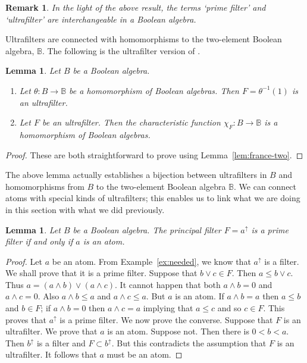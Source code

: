 \documentclass[a4paper]{amsart}
\newtheorem{lemma}[theorem]{Lemma}
\newtheorem{remark}[theorem]{Remark}
\begin{document}
\begin{remark}\label{rem:ba-prime-equal-uf}
{\em 
In the light of the above result, the terms `prime filter' and `ultrafilter' are interchangeable in a Boolean algebra.}
\end{remark}

Ultrafilters are connected with homomorphisms to the two-element Boolean algebra, $\mathbb{B}$.
The following is the ultrafilter version of \cite[Proposition 2.2]{Johnstone}.

\begin{lemma}\label{lem:hm} Let $B$ be a Boolean algebra.
\begin{enumerate} 
\item Let $\theta \colon B \rightarrow \mathbb{B}$ be a homomorphism of Boolean algebras.
Then $F = \theta^{-1}(1)$ is an ultrafilter.
\item Let $F$ be an ultrafilter. Then the characteristic function $\chi_{F} \colon B \rightarrow \mathbb{B}$
is a homomorphism of Boolean algebras.
\end{enumerate}
\end{lemma}
\begin{proof} 
These are both straightforward to prove using Lemma~\ref{lem:france-two}.
\end{proof}

The above lemma actually establishes a bijection between ultrafilters in $B$ and homomorphisms
from $B$ to the two-element Boolean algebra $\mathbb{B}$.
We can connect atoms with special kinds of ultrafilters;
this enables us to link what we are doing in this section with what we did previously.

\begin{lemma}\label{lem:green} Let $B$ be a Boolean algebra.
The principal filter $F = a^{\uparrow}$ is a prime filter if and only if $a$ is an atom.
\end{lemma}
\begin{proof} Let $a$ be an atom. From Example~\ref{ex:needed}, we know that $a^{\uparrow}$ is a filter.
We shall prove that it is a prime filter.
Suppose that $b \vee c \in F$.
Then $a \leq b \vee c$.
Thus $a = (a \wedge b) \vee (a \wedge c)$.
It cannot happen that both $a \wedge b = 0$ and $a \wedge c = 0$.
Also $a \wedge b \leq a$ and $a \wedge c \leq a$.
But $a$ is an atom.
If $a \wedge b = a$ then $a \leq b$ and $b \in F$;
if $a \wedge b = 0$ then $a \wedge c = a$ implying that $a \leq c$ and so $c \in F$.
This proves that $a^{\uparrow}$ is a prime filter.
We now prove the converse.
Suppose that $F$ is an ultrafilter.
We prove that $a$ is an atom.
Suppose not.
Then there is $0 < b < a$.
Then $b^{\uparrow}$ is a filter and $F \subset b^{\uparrow}$.
But this contradicts the assumption that $F$ is an ultrafilter.
It follows that $a$ must be an atom.
\end{proof}
\end{document}
